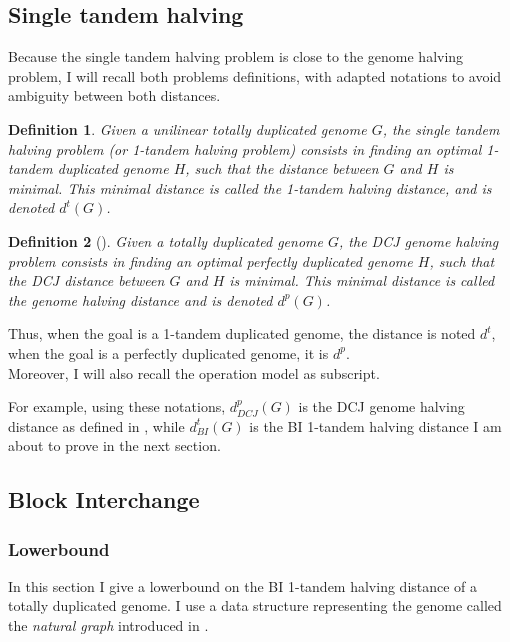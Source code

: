 \documentclass[11pt,final,twoside,nofrench]{thlifl}
\newtheorem{definition}{Definition}
\begin{document}
\subsection{Single tandem halving}

Because the single tandem halving problem is close to the genome halving problem, I will recall both problems definitions, with adapted notations to avoid ambiguity between both distances.

\begin{definition}
    Given a unilinear totally duplicated genome $G$, the \emph{single
      tandem halving problem} (or 1-tandem halving problem) consists
    in finding an \emph{optimal} 1-tandem duplicated genome $H$, such that the distance between $G$
    and $H$ is minimal. This minimal distance is called the
    \emph{1-tandem halving distance}, and is denoted $d^t(G)$.
\end{definition}

\begin{definition}[\cite{Mixtacki08}]
    Given a totally duplicated genome $G$, the \emph{DCJ genome
      halving problem} consists in finding an \emph{optimal} perfectly
    duplicated genome $H$, such that the DCJ distance between
    $G$ and $H$ is minimal. This minimal distance is called the
    \emph{genome halving distance} and is denoted $d^p(G)$.
\end{definition}

Thus, when the goal is a 1-tandem duplicated genome, the distance is noted $d^t$, when the goal is a perfectly duplicated genome, it is $d^p$.\\

Moreover, I will also recall the operation model as subscript.

For example, using these notations, $d^p_{DCJ}(G)$ is the DCJ genome halving distance as defined in \cite{Mixtacki08}, while $d^t_{BI}(G)$ is the BI 1-tandem halving distance I am about to prove in the next section.

\subsection{Block Interchange}

\subsubsection{Lowerbound}
\label{sec:lb}

\noindent
In this section I give a lowerbound on the BI 1-tandem halving distance of a totally duplicated genome. I use a data structure representing the genome called the \emph{natural graph} introduced in \cite{Mixtacki08}. 
\end{document}
